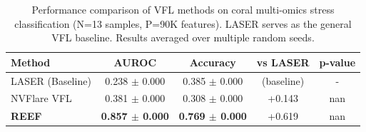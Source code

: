 
\begin{table}[h]
\centering
\caption{Performance comparison of VFL methods on coral multi-omics stress classification (N=13 samples, P=90K features). LASER serves as the general VFL baseline. Results averaged over multiple random seeds.}
\label{tab:vfl_comparison}
\begin{tabular}{lcccc}
\toprule
\textbf{Method} & \textbf{AUROC} & \textbf{Accuracy} & \textbf{vs LASER} & \textbf{p-value} \\
\midrule
LASER (Baseline) & 0.238 $\pm$ 0.000 & 0.385 $\pm$ 0.000 & (baseline) & - \\
NVFlare VFL & 0.381 $\pm$ 0.000 & 0.308 $\pm$ 0.000 & +0.143 & nan \\
\textbf{REEF} & \textbf{0.857 $\pm$ 0.000} & \textbf{0.769 $\pm$ 0.000} & +0.619 & nan \\

\bottomrule
\end{tabular}
\end{table}
